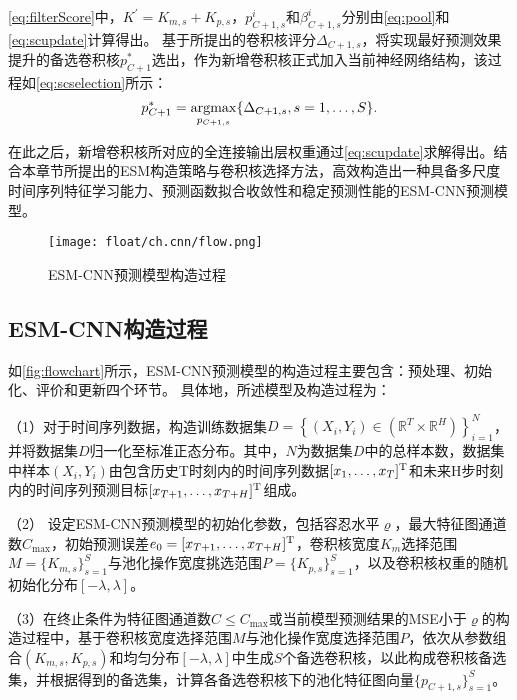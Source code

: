 \autoref{eq:filterScore}中，$K^{\prime} = K_{m,s} + K_{p,s}$，$p^i_{C+1, s}$和$\beta^i_{C+1, s}$分别由\autoref{eq:pool}和\autoref{eq:scupdate}计算得出。
基于所提出的卷积核评分$\Delta_{{C+1, s}}$，将实现最好预测效果提升的备选卷积核$p_{C+1}^{*}$选出，作为新增卷积核正式加入当前神经网络结构，该过程如\autoref{eq:scselection}所示：
\begin{equation}\label{eq:scselection}
    p_{C+1}^{*} = \operatorname*{argmax}\limits_{p_{{C+1},s}} \{ \Delta_{{C+1},s}, s = 1,\ldots,S \}.
\end{equation}

在此之后，新增卷积核所对应的全连接输出层权重通过\ref{eq:scupdate}求解得出。结合本章节所提出的ESM构造策略与卷积核选择方法，高效构造出一种具备多尺度时间序列特征学习能力、预测函数拟合收敛性和稳定预测性能的ESM-CNN预测模型。

\begin{figure*}[!t]
    \centering
    \texttt{[image: float/ch.cnn/flow.png]}
    \caption{\label{fig:flowchart} ESM-CNN预测模型构造过程}
\end{figure*}

\subsection{ESM-CNN构造过程}
如\autoref{fig:flowchart}所示，ESM-CNN预测模型的构造过程主要包含：预处理、初始化、评价和更新四个环节。
具体地，所述模型及构造过程为：

（1）对于时间序列数据，构造训练数据集$D=\left\{\left(X_{i}, Y_{i}\right) \in\left(\mathbb{R}^{T} \times \mathbb{R}^{H}\right)\right\}_{i=1}^{N}$，并将数据集$D$归一化至标准正态分布。其中，$N$为数据集$D$中的总样本数，数据集中样本$(X_i,Y_i )$由包含历史T时刻内的时间序列数据$[x_1,\ldots,x_T ]^{\operatorname{{\mathrm{T}}}}$和未来H步时刻内的时间序列预测目标$[x_{T+1},\ldots,x_{T+H}]^{\operatorname{{\mathrm{T}}}}$组成。

（2） 设定ESM-CNN预测模型的初始化参数，包括容忍水平$\varrho $，最大特征图通道数$C_{\max}$，初始预测误差$e_0 = [x_{T+1},\ldots,x_{T+H}]^{\operatorname{{\mathrm{T}}}}$，卷积核宽度$K_m$选择范围$M=\{ K_{m,s}\}^S_{s=1}$与池化操作宽度挑选范围$P=\{K_{p,s}\}^S_{s=1}$，以及卷积核权重的随机初始化分布$[-\lambda,\lambda]$。

（3）在终止条件为特征图通道数$C\leq C_{\max}$或当前模型预测结果的MSE小于$\varrho $的构造过程中，基于卷积核宽度选择范围$M$与池化操作宽度选择范围$P$，依次从参数组合$(K_{m,s}, K_{p,s})$和均匀分布$[-\lambda,\lambda]$中生成$S$个备选卷积核，以此构成卷积核备选集，并根据得到的备选集，计算各备选卷积核下的池化特征图向量$\{ p_{C+1,s}\}^S_{s=1}$。

